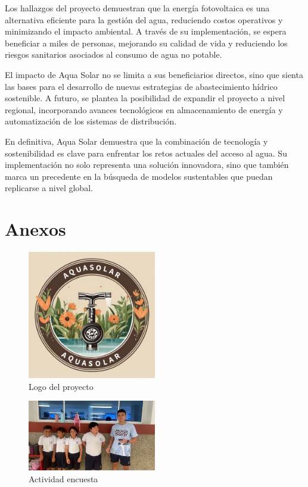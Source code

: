 \documentclass[12pt]{article}
\begin{document}
Los hallazgos del proyecto demuestran que la energía fotovoltaica es una alternativa eficiente para la gestión del agua, reduciendo costos operativos y minimizando el impacto ambiental. A través de su implementación, se espera beneficiar a miles de personas, mejorando su calidad de vida y reduciendo los riesgos sanitarios asociados al consumo de agua no potable.

El impacto de Aqua Solar no se limita a sus beneficiarios directos, sino que sienta las bases para el desarrollo de nuevas estrategias de abastecimiento hídrico sostenible. A futuro, se plantea la posibilidad de expandir el proyecto a nivel regional, incorporando avances tecnológicos en almacenamiento de energía y automatización de los sistemas de distribución.

En definitiva, Aqua Solar demuestra que la combinación de tecnología y sostenibilidad es clave para enfrentar los retos actuales del acceso al agua. Su implementación no solo representa una solución innovadora, sino que también marca un precedente en la búsqueda de modelos sustentables que puedan replicarse a nivel global.


\newpage
\nocite{*}
\newpage
\section{Anexos}

\begin{figure}[h!]
      \centering
      \includegraphics[width=0.5\textwidth]{imagenes/logo.png}
      \caption{Logo del proyecto}
      \label{fig:logo}
\end{figure}

\begin{figure}[h!]
      \centering
      \includegraphics[width=0.5\textwidth]{imagenes/actividad1.jpg}
      \caption{Actividad encuesta}
      \label{fig:actividad1}
\end{figure}
\end{document}
